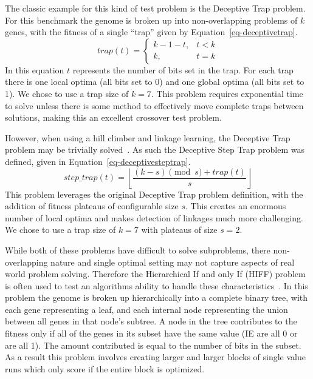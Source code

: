\documentclass{sig-alternate}
\begin{document}
The classic example for this kind of test problem is the Deceptive Trap problem.
For this benchmark the genome is broken up into non-overlapping problems of $k$
genes, with the fitness of a single ``trap'' given by Equation~\ref{eq-deceptivetrap}.
\begin{equation}
   trap(t) = \left\{
     \begin{array}{rl}
       k-1-t, &  t<k\\
       k,   &  t = k
     \end{array}
   \right.
  \label{eq-deceptivetrap}
\end{equation}
In this equation $t$ represents the number of bits set in the trap.  For each trap
there is one local optima (all bits set to 0) and one global optima (all bits set to 1).
We chose to use a trap size of $k=7$.
This problem requires exponential time to solve unless there is some method to effectively
move complete traps between solutions, making this an excellent crossover test problem.

However, when using a hill climber and linkage learning, the Deceptive Trap problem
may be trivially solved~\cite{goldman:2012:ltga}.  As such the Deceptive Step Trap
problem was defined, given in Equation~\ref{eq-deceptivesteptrap}.
\begin{equation}
   step\_trap(t) = \left \lfloor \frac{(k-s)\pmod{s} + trap(t)}{s} \right \rfloor
  \label{eq-deceptivesteptrap}
\end{equation}
This problem leverages the original Deceptive Trap problem definition, with the
addition of fitness plateaus of configurable size $s$.  This creates an enormous
number of local optima and makes detection of linkages much more challenging.  We
chose to use a trap size of $k=7$ with plateaus of size $s=2$.

While both of these problems have difficult to solve subproblems, there non-overlapping
nature and single optimal setting may not capture aspects of real world problem solving.
Therefore the Hierarchical If and only If (HIFF) problem is often used to test an
algorithms ability to handle these characteristics~\cite{thierens:2013:ltgahiff}.
In this problem the genome is broken up hierarchically into a complete binary tree,
with each gene representing a leaf, and each internal node representing the union
between all genes in that node's subtree.  A node in the tree contributes to the fitness
only if all of the genes in its subset have the same value (IE are all 0 or are all 1).
The amount contributed is equal to the number of bits in the subset.  As a result
this problem involves creating larger and larger blocks of single value runs which
only score if the entire block is optimized.
\end{document}
